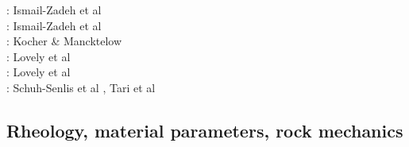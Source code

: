 \begin{scriptsize}
\twothousandone: Ismail-Zadeh et al \cite{istv01}\\
\twothousandfour: Ismail-Zadeh et al \cite{istt04}\\
\twothousandfive: Kocher \& Mancktelow \cite{koma05}\\
\twothousandtwelve: Lovely et al \cite{lofg12}\\
\twothousandeighteen: Lovely et al \cite{lojm18}\\
\twothousandtwenty: Schuh-Senlis et al \cite{sctc20}, Tari et al \cite{taas20}
\end{scriptsize}


\subsection{Rheology, material parameters, rock mechanics}

